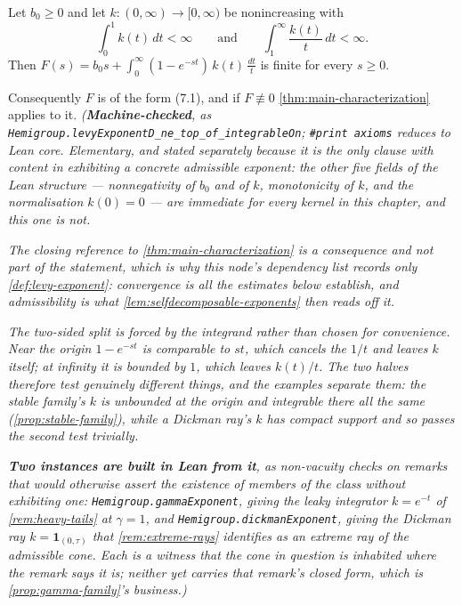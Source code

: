 \begin{proposition}\label{prop:admissibility-criterion}
\leanok
Let $b_0 \ge 0$ and let $k : (0,\infty) \to [0,\infty)$ be nonincreasing with
\[
  \int_0^1 k(t)\,dt < \infty
  \qquad\text{and}\qquad
  \int_1^\infty \frac{k(t)}{t}\,dt < \infty .
\]
Then $F(s) = b_0 s + \int_0^\infty (1 - e^{-st})\,k(t)\,\frac{dt}{t}$ is finite for every
$s \ge 0$.

Consequently $F$ is of the form (7.1), and if $F \not\equiv 0$ \ref{thm:main-characterization}
applies to it.
\statusT\quad\emph{(\textbf{Machine-checked}, as
\texttt{Hemigroup.levyExponentD\_ne\_top\_of\_integrableOn}; \texttt{\#print axioms} reduces to
Lean core. Elementary, and stated separately because it is the \emph{only} clause with content
in exhibiting a concrete admissible exponent: the other five fields of the Lean structure ---
nonnegativity of $b_0$ and of $k$, monotonicity of $k$, and the normalisation $k(0)=0$ --- are
immediate for every kernel in this chapter, and this one is not.}

\emph{The closing reference to \ref{thm:main-characterization} is a consequence and not part of
the statement, which is why this node's dependency list records only \ref{def:levy-exponent}:
convergence is all the estimates below establish, and admissibility is what
\ref{lem:selfdecomposable-exponents} then reads off it.}

\emph{The two-sided split is forced by the integrand rather than chosen for convenience.
Near the origin $1 - e^{-st}$ is comparable to $st$, which cancels the $1/t$ and leaves $k$
itself; at infinity it is bounded by $1$, which leaves $k(t)/t$. The two halves therefore test
genuinely different things, and the examples separate them: the stable family's $k$ is
\emph{unbounded} at the origin and integrable there all the same
(\ref{prop:stable-family}), while a Dickman ray's $k$ has compact support and so passes the
second test trivially.}

\emph{\textbf{Two instances are built in Lean from it}, as non-vacuity checks on remarks that
would otherwise assert the existence of members of the class without exhibiting one:
\texttt{Hemigroup.gammaExponent}, giving the leaky integrator $k = e^{-t}$ of
\ref{rem:heavy-tails} at $\gamma = 1$, and \texttt{Hemigroup.dickmanExponent}, giving the
Dickman ray $k = \mathbf{1}_{(0,\tau)}$ that \ref{rem:extreme-rays} identifies as an extreme ray
of the admissible cone. Each is a witness that the cone in question is inhabited where the
remark says it is; neither yet carries that remark's closed form, which is
\ref{prop:gamma-family}'s business.)}
\end{proposition}


